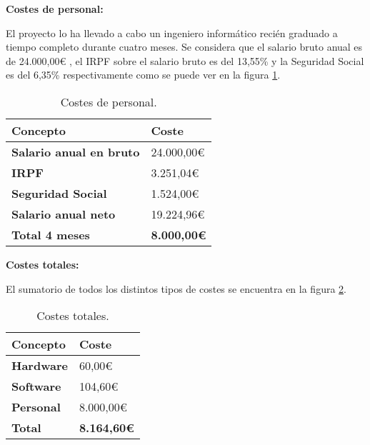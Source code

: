 \textbf{Costes de personal:}

El proyecto lo ha llevado a cabo un ingeniero informático recién graduado a tiempo completo durante cuatro meses. Se considera que el salario bruto anual es de 24.000,00€ \cite{sueldoIIespaña}, el IRPF sobre el salario bruto es del 13,55\% y la Seguridad Social es del 6,35\% respectivamente como se puede ver en la figura \ref{tabla:costes-de-personal}.

\begin{table}[h!]
    \centering
    \begin{tabular}{l l}
        \hline
        \textbf{Concepto}                   & \textbf{Coste}        \\
        \hline
        \textbf{Salario anual en bruto}     & 24.000,00€            \\
        \textbf{IRPF}                       & 3.251,04€             \\
        \textbf{Seguridad Social}           & 1.524,00€             \\
        \textbf{Salario anual neto}         & 19.224,96€            \\
        \hline
        \textbf{Total 4 meses}              & \textbf{8.000,00€}    \\
        \hline
    \end{tabular}
    \caption{Costes de personal.}\label{tabla:costes-de-personal}
\end{table}

\textbf{Costes totales:}

El sumatorio de todos los distintos tipos de costes se encuentra en la figura \ref{tabla:costes-de-totales}.

\begin{table}[h!]
    \centering
    \begin{tabular}{l l}
        \hline
        \textbf{Concepto}   & \textbf{Coste}        \\
        \hline
        \textbf{Hardware}   & 60,00€                \\
        \textbf{Software}   & 104,60€               \\
        \textbf{Personal}   & 8.000,00€             \\
        \hline
        \textbf{Total}      & \textbf{8.164,60€}    \\
        \hline
    \end{tabular}
    \caption{Costes totales.}\label{tabla:costes-de-totales}
\end{table}

